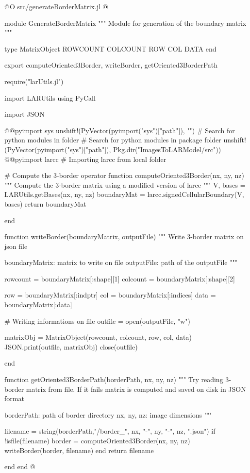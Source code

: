 \documentclass[11pt,oneside]{article}	%
\begin{document}
@O src/generateBorderMatrix.jl
@{module GenerateBorderMatrix
"""
Module for generation of the boundary matrix
"""

type MatrixObject
  ROWCOUNT
  COLCOUNT
  ROW
  COL
  DATA
end


export computeOriented3Border, writeBorder, getOriented3BorderPath

require("larUtils.jl")

import LARUtils
using PyCall

import JSON

@@pyimport sys
unshift!(PyVector(pyimport("sys")["path"]), "") # Search for python modules in folder
# Search for python modules in package folder
unshift!(PyVector(pyimport("sys")["path"]), Pkg.dir("ImagesToLARModel/src"))
@@pyimport larcc # Importing larcc from local folder

# Compute the 3-border operator
function computeOriented3Border(nx, ny, nz)
  """
  Compute the 3-border matrix using a modified
  version of larcc
  """
  V, bases = LARUtils.getBases(nx, ny, nz)
  boundaryMat = larcc.signedCellularBoundary(V, bases)
  return boundaryMat

end

function writeBorder(boundaryMatrix, outputFile)
  """
  Write 3-border matrix on json file

  boundaryMatrix: matrix to write on file
  outputFile: path of the outputFile
  """

  rowcount = boundaryMatrix[:shape][1]
  colcount = boundaryMatrix[:shape][2]

  row = boundaryMatrix[:indptr]
  col = boundaryMatrix[:indices]
  data = boundaryMatrix[:data]

  # Writing informations on file
  outfile = open(outputFile, "w")

  matrixObj = MatrixObject(rowcount, colcount, row, col, data)
  JSON.print(outfile, matrixObj)
  close(outfile)

end

function getOriented3BorderPath(borderPath, nx, ny, nz)
  """
  Try reading 3-border matrix from file. If it fails matrix
  is computed and saved on disk in JSON format

  borderPath: path of border directory
  nx, ny, nz: image dimensions
  """

  filename = string(borderPath,"/border_", nx, "-", ny, "-", nz, ".json")
  if !isfile(filename)
    border = computeOriented3Border(nx, ny, nz)
    writeBorder(border, filename)
  end
  return filename

end
end
@}
\end{document}
